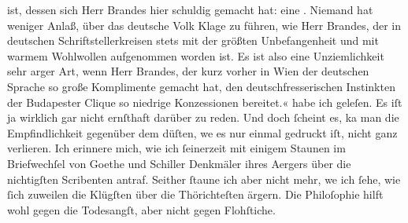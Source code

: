 {{{                     ist, dessen sich Herr Brandes hier
                     schuldig gemacht hat: eine . Niemand
                     hat weniger Anlaß, über das deutsche Volk Klage zu führen, wie Herr Brandes, der in deutschen
                     Schriftstellerkreisen stets mit der größten Unbefangenheit und mit warmem
                     Wohlwollen aufgenommen worden ist. Es ist also eine Unziemlichkeit sehr arger
                     Art, wenn Herr Brandes, der kurz vorher
                     in Wien der deutschen Sprache so große
                     Komplimente gemacht hat, den deutschfresserischen Instinkten der Budapester Clique so niedrige Konzessionen
                     bereitet.«}}}\label{K_L01034-4} habe ich geleſen. Es iſt ja wirklich gar nicht
               ernſthaft darüber zu reden. Und doch ſcheint es, ka{\geminationn} man
               die Empfindlichkeit gegenüber dem dü{\geminationm}ſten, we{\geminationn} es nur einmal gedruckt iſt, nicht ganz verlieren. Ich
               erinnere mich, wie ich ſeinerzeit mit einigem Staunen im Briefwechſel von Goethe und Schiller Denkmäler ihres Aergers über die nichtigſten Scribenten antraf.
               Seither ſtaune ich {\pb}aber nicht mehr, we{\geminationn} ich ſehe, wie ſich zuweilen die Klügſten über die
               Thörichteſten ärgern. Die Philoſophie hilft wohl gegen die Todesangſt, aber nicht
               gegen Flohſtiche.\pend
           
